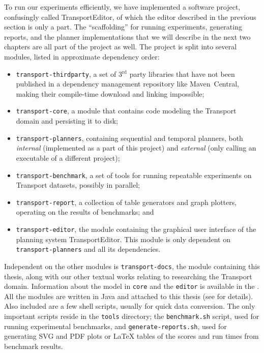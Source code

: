 To run our experiments efficiently, we have implemented a software project,
confusingly called TransportEditor, of which the editor described in
the previous section is only a part.
The ``scaffolding'' for running experiments, generating reports, and the planner implementations that we will describe in the next two chapters are all part
of the project as well.
The project is split into several modules, listed in approximate dependency order:
\begin{itemize}
\item \texttt{transport-thirdparty}, a set of 3$^\textrm{rd}$ party libraries
that have not been published in a dependency management repository like Maven~Central,
making their compile-time download and linking impossible;
\item \texttt{transport-core}, a module that contains code modeling the Transport
domain and persisting it to disk;
\item \texttt{transport-planners}, containing sequential and temporal planners, both \textit{internal} (implemented as a part of this project) and \textit{external}
(only calling an executable of a different project);
\item \texttt{transport-benchmark}, a set of tools for running repeatable
experiments on Transport datasets, possibly in parallel;
\item \texttt{transport-report}, a collection of table generators and graph plotters,
operating on the results of benchmarks; and
\item \texttt{transport-editor}, the module containing the graphical user interface
of the planning system TransportEditor. This module is only dependent
on \texttt{transport-planners} and all its dependencies.
\end{itemize}
Independent on the other modules is \texttt{transport-docs},
the module containing this thesis,
along with our other textual works relating to researching the Transport domain.
Information about the model in \texttt{core} and the
\texttt{editor}
is available in the .
All the modules are written in Java and attached to this thesis (see  for details). Also included are a few shell scripts, usually for quick
data conversion. The only important scripts reside in the \texttt{tools} directory;
the \texttt{benchmark.sh} script, used for running experimental benchmarks,
and \texttt{generate-reports.sh}, used for generating SVG and PDF plots or \LaTeX{} tables of the scores and run times from benchmark results.


